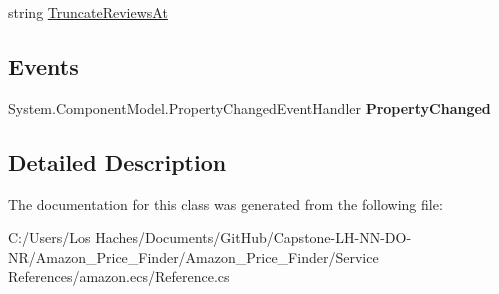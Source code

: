 \begin{DoxyCompactItemize}
\begin{DoxyCompactList}\small\item\em \end{DoxyCompactList}\item 
\hypertarget{class_amazon___price___finder_1_1amazon_1_1ecs_1_1_item_search_request_a3b181593aa64cf27487e5079890f74e3}{string \hyperlink{class_amazon___price___finder_1_1amazon_1_1ecs_1_1_item_search_request_a3b181593aa64cf27487e5079890f74e3}{Truncate\-Reviews\-At}}\label{class_amazon___price___finder_1_1amazon_1_1ecs_1_1_item_search_request_a3b181593aa64cf27487e5079890f74e3}

\begin{DoxyCompactList}\small\item\em \end{DoxyCompactList}\end{DoxyCompactItemize}
\subsection*{Events}
\begin{DoxyCompactItemize}
\item 
\hypertarget{class_amazon___price___finder_1_1amazon_1_1ecs_1_1_item_search_request_aeb02487f6630607618b8dc6e3698a521}{System.\-Component\-Model.\-Property\-Changed\-Event\-Handler {\bfseries Property\-Changed}}\label{class_amazon___price___finder_1_1amazon_1_1ecs_1_1_item_search_request_aeb02487f6630607618b8dc6e3698a521}

\end{DoxyCompactItemize}


\subsection{Detailed Description}


The documentation for this class was generated from the following file\-:\begin{DoxyCompactItemize}
\item 
C\-:/\-Users/\-Los Haches/\-Documents/\-Git\-Hub/\-Capstone-\/\-L\-H-\/\-N\-N-\/\-D\-O-\/\-N\-R/\-Amazon\-\_\-\-Price\-\_\-\-Finder/\-Amazon\-\_\-\-Price\-\_\-\-Finder/\-Service References/amazon.\-ecs/Reference.\-cs\end{DoxyCompactItemize}
